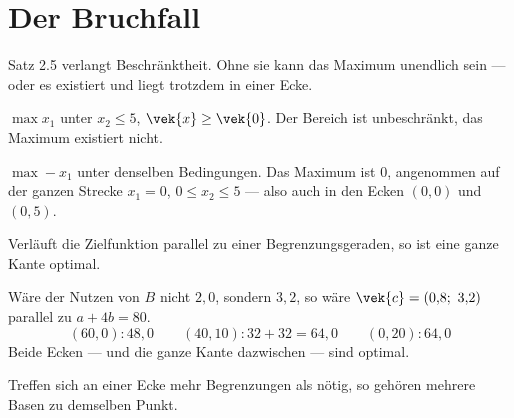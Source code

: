 \section{Der Bruchfall}

\begin{warnung}
Satz 2.5 verlangt Beschränktheit. Ohne sie kann das Maximum unendlich sein --- oder es existiert und liegt trotzdem in einer Ecke.

 $\max x_1$ unter $x_2 \le 5$, $\vek{x} \ge \vek{0}$. Der Bereich ist unbeschränkt, das Maximum existiert nicht.

 $\max -x_1$ unter denselben Bedingungen. Das Maximum ist $0$, angenommen auf der ganzen Strecke $x_1 = 0$, $0 \le x_2 \le 5$ --- also auch in den Ecken $(0,0)$ und $(0,5)$.

\begin{center}
\begin{minipage}{0.88\textwidth}
\end{minipage}
\end{center}

Verläuft die Zielfunktion parallel zu einer Begrenzungsgeraden, so ist eine ganze Kante optimal.

 Wäre der Nutzen von $B$ nicht $2{,}0$, sondern $3{,}2$, so wäre $\vek{c} = (0{,}8;\ 3{,}2)$ parallel zu $a+4b=80$.
\[ (60,0)\!: 48{,}0 \qquad (40,10)\!: 32+32 = 64{,}0 \qquad (0,20)\!: 64{,}0 \]
Beide Ecken --- und die ganze Kante dazwischen --- sind optimal.

\begin{center}
\begin{minipage}{0.88\textwidth}
\end{minipage}
\end{center}

Treffen sich an einer Ecke mehr Begrenzungen als nötig, so gehören mehrere Basen zu demselben Punkt.


\end{warnung}
